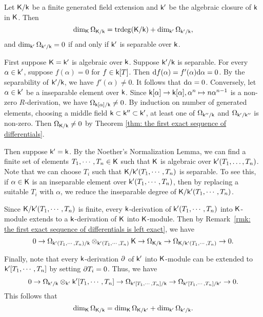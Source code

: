     \begin{example}\label{eg: module of differential for field extensions}
        Let \(\KK/\kk\) be a finite generated field extension and \(\kk'\) be the algebraic closure of \(\kk\) in \(\KK\).
        Then 
        \[ \dim_\KK \Omega_{\KK/\kk} = \trdeg(\KK/\kk) + \dim_{\kk'} \Omega_{\kk'/\kk}, \]
        and \(\dim_{\kk'} \Omega_{\kk'/\kk} = 0\) if and only if \(\kk'\) is separable over \(\kk\).

        First suppose \(\KK = \kk'\) is algebraic over \(\kk\).
        Suppose \(\kk'/\kk\) is separable.
        For every \(\alpha \in \kk'\), suppose \(f(\alpha) = 0\) for \(f \in \kk[T]\).
        Then \(\d f(\alpha) = f'(\alpha) \d \alpha = 0\).
        By the separability of \(\kk'/\kk\), we have \(f'(\alpha) \neq 0\).
        It follows that \(\d \alpha = 0\).
        Conversely, let \(\alpha \in \kk'\) be a inseparable element over \(\kk\).
        Since \(\kk[\alpha] \to \kk[\alpha], \alpha^n \mapsto n\alpha^{n-1}\) is a non-zero \(R\)-derivation, we have \(\Omega_{\kk[\alpha]/\kk} \neq 0\).
        By induction on number of generated elements, choosing a middle field \(\kk \subset \kk'' \subset \kk'\), at least one of \(\Omega_{\kk''/\kk}\) and \(\Omega_{\kk'/\kk''}\) is non-zero.
        Then \(\Omega_{\KK/\kk} \neq 0\) by Theorem \ref{thm: the first exact sequence of differentials}.

        Then suppose \(\kk' = \kk\).
        By the Noether's Normalization Lemma, we can find a finite set of elements \(T_1, \cdots, T_n \in \KK\) such that \(\KK\) is algebraic over \(\kk'(T_1, \ldots, T_n)\).
        Note that we can choose \(T_i\) such that \(\KK/\kk'(T_1, \cdots, T_n)\) is separable.
        To see this, if \(\alpha \in \KK\) is an inseparable element over \(\kk'(T_1,\cdots,T_n)\), 
        then by replacing a suitable \(T_i\) with \(\alpha\), we reduce the inseparable degree of \(\KK/\kk'(T_1, \cdots, T_n)\).
        
        Since \(\KK/\kk'(T_1, \cdots, T_n)\) is finite, every \(\kk\)-derivation of \(\kk'(T_1,\cdots,T_n)\) into \(\KK\)-module extends to a \(\kk\)-derivation of \(\KK\) into \(\KK\)-module.
        Then by Remark~\ref{rmk: the first exact sequence of differentials is left exact}, we have 
        \[ 0 \to \Omega_{\kk'(T_1, \cdots, T_n)/\kk} \ten_{\kk'(T_1,\cdots,T_n)} \KK \to \Omega_{\KK/\kk} \to \Omega_{\KK/\kk'(T_1,\cdots,T_n)} \to 0. \]
        
        Finally, note that every \(\kk\)-derivation \(\P\) of \(\kk'\) into \(\KK\)-module can be extended to \(\kk'[T_1,\cdots,T_n]\) by setting \(\P T_i = 0\).
        Thus, we have 
        \[ 0 \to \Omega_{\kk'/\kk} \ten_{\kk'} \kk'[T_1,\cdots,T_n] \to \Omega_{\kk'[T_1,\cdots,T_n]/\kk} \to \Omega_{\kk'[T_1,\cdots,T_n]/\kk'} \to 0. \]
        This follows that 
        \[ \dim_\KK \Omega_{\KK/\kk} = \dim_{\KK} \Omega_{\KK/\kk'} + \dim_{\kk'}\Omega_{\kk'/\kk}. \]
    \end{example}



